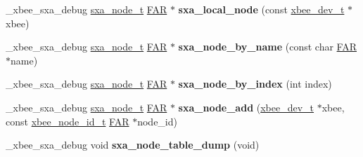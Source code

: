 \begin{DoxyCompactItemize}
\item 
\hypertarget{group___s_x_a_gaa489c5f8d5296fd609793f3a46f8b62e}{\-\_\-xbee\-\_\-sxa\-\_\-debug \hyperlink{structsxa__node__t}{sxa\-\_\-node\-\_\-t} \hyperlink{group__hal_gaef060b3456fdcc093a7210a762d5f2ed}{F\-A\-R} $\ast$ {\bfseries sxa\-\_\-local\-\_\-node} (const \hyperlink{structxbee__dev__t}{xbee\-\_\-dev\-\_\-t} $\ast$xbee)}\label{group___s_x_a_gaa489c5f8d5296fd609793f3a46f8b62e}

\item 
\hypertarget{group___s_x_a_ga0b1c597794cd34a06c04b1a8d7a67985}{\-\_\-xbee\-\_\-sxa\-\_\-debug \hyperlink{structsxa__node__t}{sxa\-\_\-node\-\_\-t} \hyperlink{group__hal_gaef060b3456fdcc093a7210a762d5f2ed}{F\-A\-R} $\ast$ {\bfseries sxa\-\_\-node\-\_\-by\-\_\-name} (const char \hyperlink{group__hal_gaef060b3456fdcc093a7210a762d5f2ed}{F\-A\-R} $\ast$name)}\label{group___s_x_a_ga0b1c597794cd34a06c04b1a8d7a67985}

\item 
\hypertarget{group___s_x_a_ga1712e218c433eb314121599866b9b886}{\-\_\-xbee\-\_\-sxa\-\_\-debug \hyperlink{structsxa__node__t}{sxa\-\_\-node\-\_\-t} \hyperlink{group__hal_gaef060b3456fdcc093a7210a762d5f2ed}{F\-A\-R} $\ast$ {\bfseries sxa\-\_\-node\-\_\-by\-\_\-index} (int index)}\label{group___s_x_a_ga1712e218c433eb314121599866b9b886}

\item 
\hypertarget{group___s_x_a_ga30754e1f60c895be7c4cf1818ea3e777}{\-\_\-xbee\-\_\-sxa\-\_\-debug \hyperlink{structsxa__node__t}{sxa\-\_\-node\-\_\-t} \hyperlink{group__hal_gaef060b3456fdcc093a7210a762d5f2ed}{F\-A\-R} $\ast$ {\bfseries sxa\-\_\-node\-\_\-add} (\hyperlink{structxbee__dev__t}{xbee\-\_\-dev\-\_\-t} $\ast$xbee, const \hyperlink{structxbee__node__id__t}{xbee\-\_\-node\-\_\-id\-\_\-t} \hyperlink{group__hal_gaef060b3456fdcc093a7210a762d5f2ed}{F\-A\-R} $\ast$node\-\_\-id)}\label{group___s_x_a_ga30754e1f60c895be7c4cf1818ea3e777}

\item 
\hypertarget{group___s_x_a_ga63185b350cf48c154f2071931fd7d0d9}{\-\_\-xbee\-\_\-sxa\-\_\-debug void {\bfseries sxa\-\_\-node\-\_\-table\-\_\-dump} (void)}\label{group___s_x_a_ga63185b350cf48c154f2071931fd7d0d9}


\end{DoxyCompactItemize}
